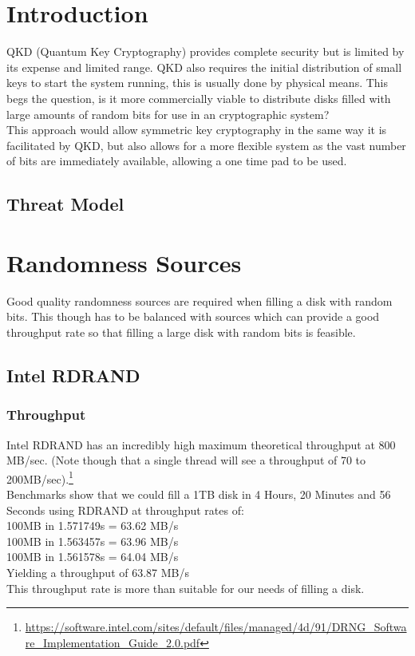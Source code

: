 \documentclass{paper}
\begin{document}
	\maketitle
	\section{Introduction}
		QKD (Quantum Key Cryptography) provides complete security but is limited by its expense and limited range. QKD also requires the initial distribution of small keys to start the system running, this is usually done by physical means. This begs the question, is it more commercially viable to distribute disks filled with large amounts of random bits for use in an cryptographic system?\\
		This approach would allow symmetric key cryptography in the same way it is facilitated by QKD, but also allows for a more flexible system as the vast number of bits are immediately available, allowing a one time pad to be used.\\
	\subsection{Threat Model}
	
	
	\section{Randomness Sources}
		Good quality randomness sources are required when filling a disk with random bits. This though has to be balanced with sources which can provide a good throughput rate so that filling a large disk with random bits is feasible.\\ 
	
		\subsection{Intel RDRAND}
			\subsubsection{Throughput}
				Intel RDRAND has an incredibly high maximum theoretical throughput at 800 MB/sec. (Note though that a single thread will see a throughput of 70 to 200MB/sec).\footnote{\url{https://software.intel.com/sites/default/files/managed/4d/91/DRNG_Software_Implementation_Guide_2.0.pdf}} \\
				Benchmarks show that we could fill a 1TB disk in 4 Hours, 20 Minutes and 56 Seconds using RDRAND at throughput rates of:\\
				100MB in 1.571749s = 63.62 MB/s\\
				100MB in 1.563457s = 63.96 MB/s\\
				100MB in 1.561578s = 64.04 MB/s\\
				Yielding a  throughput of 63.87 MB/s\\
				This throughput rate is more than suitable for our needs of filling a disk.
\end{document}
